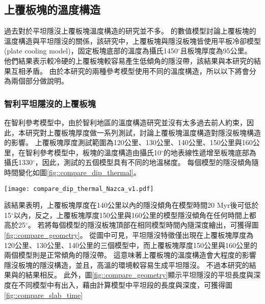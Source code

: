 \subsection{上覆板塊的溫度構造}
過去對於平坦隱沒上覆板塊溫度構造的研究並不多。
\citealp{Thermal2012}的數值模型討論上覆板塊的溫度構造與平坦隱沒的關係，該研究中，上覆板塊與隱沒板塊皆使用平板冷卻模型(plate cooling model)，固定板塊底部的溫度為攝氏1450$^\circ$且板塊厚度為95公里。
他們結果表示較冷硬的上覆板塊較容易產生低傾角的隱沒帶，該結果與本研究的結果互相矛盾。
由於本研究的兩種參考模型使用不同的溫度構造，所以以下將會分為兩個部分做說明。

\subsubsection{智利平坦隱沒的上覆板塊}
在智利參考模型中，由於智利地區的溫度構造研究並沒有太多過去前人約束，因此，本研究對上覆板塊厚度做一系列測試，討論上覆板塊溫度構造對隱沒板塊構造的影響。
上覆板塊厚度測試範圍為120公里、130公里、140公里、150公里與160公里，在智利參考模型中，板塊的溫度構造由攝氏10$^\circ$的地表線性遞增至板塊底部為攝氏1330$^\circ$，因此，測試的五個模型具有不同的地溫梯度。
每個模型的隱沒傾角隨時間變化如圖\ref{fig::compare_dip_thermal}。

\begin{figure*}[h]
    \centering
    \texttt{[image: compare\_dip\_thermal\_Nazca\_v1.pdf]}
    \caption[不同上覆板塊厚度模型之隱沒傾角隨時間變化]{不同上覆板塊厚度模型之隱沒傾角隨時間變化。}
    \label{fig::compare_dip_thermal}
\end{figure*}

該結果表明，上覆板塊厚度在140公里以內的隱沒傾角在模型時間20 Myr後可低於15$^\circ$以內，反之，上覆板塊厚度150公里與160公里的模型隱沒傾角在任何時間上都高於25$^\circ$。
若將每個模型的隱沒板塊頂部在相同模型時間內隨深度繪出，可獲得圖\ref{fig::compare_geometry}。
從圖中可見，平坦隱沒特徵僅出現在上覆板塊厚度為120公里、130公里、140公里的三個模型中，而上覆板塊厚度150公里與160公里的兩個模型則是正常傾角的隱沒帶。
這意味著上覆板塊的溫度構造會大程度的影響隱沒板塊的隱沒構造，並且，高溫的環境較容易生成平坦隱沒。
不過本研究的結果與\citealp{Thermal2012}的結果相反。
此外，圖\ref{fig::compare_geometry}顯示平坦隱沒的平坦長度與深度在不同模型中有出入，藉由計算模型中平坦段的長度與深度，可獲得圖\ref{fig::compare_slab_time}

